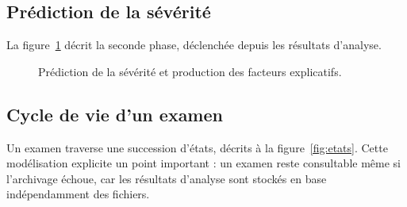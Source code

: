 \subsection{Prédiction de la sévérité}

La figure~\ref{fig:seq-osa} décrit la seconde phase, déclenchée depuis les résultats
d'analyse.

\begin{figure}[H]
\centering
{}
\caption[Séquence de prédiction de la sévérité]%
        {Prédiction de la sévérité et production des facteurs explicatifs.}
\label{fig:seq-osa}
\end{figure}

\subsection{Cycle de vie d'un examen}

Un examen traverse une succession d'états, décrits à la
figure~\ref{fig:etats}. Cette modélisation explicite un point important : un examen
reste consultable même si l'archivage échoue, car les résultats d'analyse sont
stockés en base indépendamment des fichiers.

